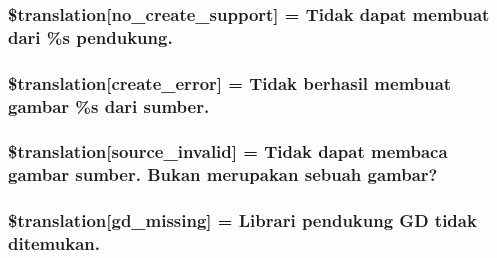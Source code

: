 \subsubsection[{\$translation}]{\setlength{\rightskip}{0pt plus 5cm}\$translation\mbox{[}\textquotesingle{}no\+\_\+create\+\_\+support\textquotesingle{}\mbox{]} = \textquotesingle{}Tidak dapat membuat dari \%s pendukung.\textquotesingle{}}\label{class_8upload_8id___i_d_8php_a346dfd1ade29f583dd20d345c436859f}
\hypertarget{class_8upload_8id___i_d_8php_a53013ce9255c4e1849098ddd9fdb2b3f}{}
\subsubsection[{\$translation}]{\setlength{\rightskip}{0pt plus 5cm}\$translation\mbox{[}\textquotesingle{}create\+\_\+error\textquotesingle{}\mbox{]} = \textquotesingle{}Tidak berhasil membuat gambar \%s dari sumber.\textquotesingle{}}\label{class_8upload_8id___i_d_8php_a53013ce9255c4e1849098ddd9fdb2b3f}
\hypertarget{class_8upload_8id___i_d_8php_a6ab0a660b457eaf2d3434b225449fdd6}{}
\subsubsection[{\$translation}]{\setlength{\rightskip}{0pt plus 5cm}\$translation\mbox{[}\textquotesingle{}source\+\_\+invalid\textquotesingle{}\mbox{]} = \textquotesingle{}Tidak dapat membaca gambar sumber. Bukan merupakan sebuah gambar?\textquotesingle{}}\label{class_8upload_8id___i_d_8php_a6ab0a660b457eaf2d3434b225449fdd6}
\hypertarget{class_8upload_8id___i_d_8php_a7f3dfcc0db4bbc0f2e7210c439798e56}{}
\subsubsection[{\$translation}]{\setlength{\rightskip}{0pt plus 5cm}\$translation\mbox{[}\textquotesingle{}gd\+\_\+missing\textquotesingle{}\mbox{]} = \textquotesingle{}Librari pendukung G\+D tidak ditemukan.\textquotesingle{}}\label{class_8upload_8id___i_d_8php_a7f3dfcc0db4bbc0f2e7210c439798e56}
\hypertarget{class_8upload_8id___i_d_8php_a82d5853430ab72dc1f9799ec36144cc6}{}
